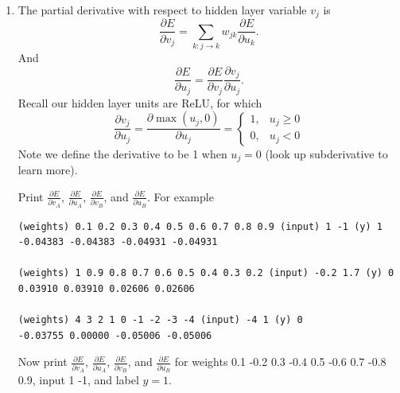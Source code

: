 \documentclass[a4paper]{article}
\theoremstyle{definition}
\newenvironment{soln}{
    \leavevmode\color{blue}\ignorespaces
}{}
\begin{document}
\begin{enumerate}
Print $E$, $\frac{\partial E}{\partial v_C}$, and $\frac{\partial E}{\partial u_C}$. 
For example,
\begin{verbatim}
(weights) 0.1 0.2 0.3 0.4 0.5 0.6 0.7 0.8 0.9 (input) 1 -1 (y) 1
0.03778 -0.27488 -0.05479

(weights) 1 0.9 0.8 0.7 0.6 0.5 0.4 0.3 0.2 (input) -0.2 1.7 (y) 0
0.31402 0.79249 0.13032

(weights) 4 3 2 1 0 -1 -2 -3 -4 (input) -4 1 (y) 0
0.00710 0.11920 0.01252
\end{verbatim}

Now compute $E$, $\frac{\partial E}{\partial v_C}$, and $\frac{\partial E}{\partial u_C}$ for weights 0.1 -0.2 0.3 -0.4 0.5 -0.6 0.7 -0.8 0.9, input 1 -1, and label $y=1$.

\begin{soln}

\begin{verbatim}
(weights) 0.1 -0.2 0.3 -0.4 0.5 -0.6 0.7 -0.8 0.9 (input) 1 -1 (y) 1
0.02187 -0.20916 -0.03460
\end{verbatim}

\end{soln}

\item 
The partial derivative with respect to hidden layer variable $v_j$ is
$$\frac{\partial E}{\partial v_j} = \sum_{k: j\rightarrow k} w_{jk} \frac{\partial E}{\partial u_k}.$$
And 
$$\frac{\partial E}{\partial u_j} = \frac{\partial E}{\partial v_j} \frac{\partial v_j}{\partial u_j}.$$
Recall our hidden layer units are ReLU, for which
$$\frac{\partial v_j}{\partial u_j}=\frac{\partial \max(u_j, 0)}{\partial u_j}=\left\{
\begin{array}{ll}
1, & u_j \ge 0 \\
0, & u_j < 0 
\end{array}
\right.$$
Note we define the derivative to be 1 when $u_j=0$ (look up subderivative to learn more).

Print $\frac{\partial E}{\partial v_A}$, $\frac{\partial E}{\partial u_A}$, $\frac{\partial E}{\partial v_B}$, and $\frac{\partial E}{\partial u_B}$.
For example
\begin{verbatim}
(weights) 0.1 0.2 0.3 0.4 0.5 0.6 0.7 0.8 0.9 (input) 1 -1 (y) 1
-0.04383 -0.04383 -0.04931 -0.04931

(weights) 1 0.9 0.8 0.7 0.6 0.5 0.4 0.3 0.2 (input) -0.2 1.7 (y) 0
0.03910 0.03910 0.02606 0.02606

(weights) 4 3 2 1 0 -1 -2 -3 -4 (input) -4 1 (y) 0
-0.03755 0.00000 -0.05006 -0.05006
\end{verbatim}
Now print $\frac{\partial E}{\partial v_A}$, $\frac{\partial E}{\partial u_A}$, $\frac{\partial E}{\partial v_B}$, and $\frac{\partial E}{\partial u_B}$ for weights 0.1 -0.2 0.3 -0.4 0.5 -0.6 0.7 -0.8 0.9, input 1 -1, and label $y=1$.


\end{enumerate}
\end{document}
